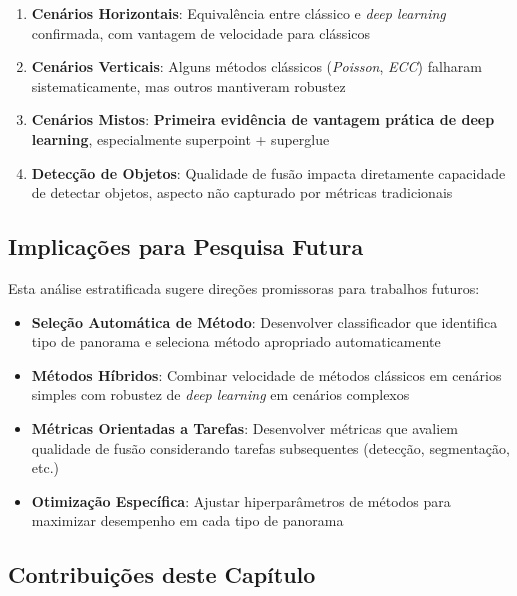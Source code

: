 \begin{enumerate}
    \item \textbf{Cenários Horizontais}: Equivalência entre clássico e \textit{deep learning} confirmada, com vantagem de velocidade para clássicos

    \item \textbf{Cenários Verticais}: Alguns métodos clássicos (\textit{Poisson}, \textit{ECC}) falharam sistematicamente, mas outros mantiveram robustez

    \item \textbf{Cenários Mistos}: \textbf{Primeira evidência de vantagem prática de deep learning}, especialmente \gls{superpoint} + \gls{superglue}

    \item \textbf{Detecção de Objetos}: Qualidade de fusão impacta diretamente capacidade de detectar objetos, aspecto não capturado por métricas tradicionais
\end{enumerate}

\subsection{Implicações para Pesquisa Futura}

Esta análise estratificada sugere direções promissoras para trabalhos futuros:

\begin{itemize}
    \item \textbf{Seleção Automática de Método}: Desenvolver classificador que identifica tipo de panorama e seleciona método apropriado automaticamente

    \item \textbf{Métodos Híbridos}: Combinar velocidade de métodos clássicos em cenários simples com robustez de \textit{deep learning} em cenários complexos

    \item \textbf{Métricas Orientadas a Tarefas}: Desenvolver métricas que avaliem qualidade de fusão considerando tarefas subsequentes (detecção, segmentação, etc.)

    \item \textbf{Otimização Específica}: Ajustar hiperparâmetros de métodos para maximizar desempenho em cada tipo de panorama
\end{itemize}

\subsection{Contribuições deste Capítulo}

